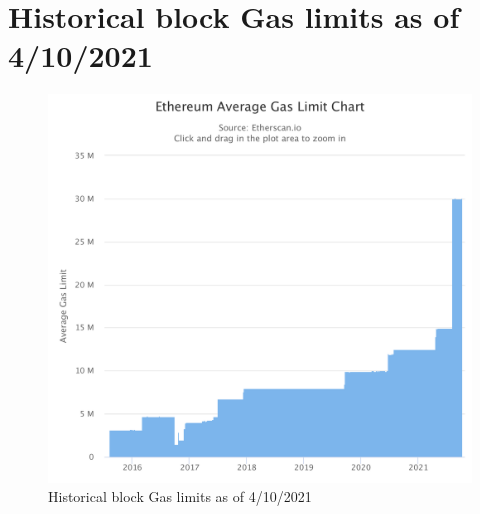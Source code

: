 \chapter{Historical block Gas limits as of 4/10/2021}\label{block_gas_limit}

\begin{figure}[htbp!]
\centering
\includegraphics[scale=0.26]{dependencies/Img/historical_gas_chart}
\caption{Historical block Gas limits as of 4/10/2021}
\end{figure}
